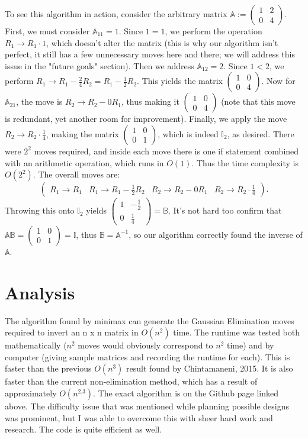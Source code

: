 \documentclass{article}
\begin{document}
To see this algorithm in action, consider the arbitrary matrix $\mathbb{A}:=\begin{pmatrix}1 & 2 \\ 0 & 4\end{pmatrix}$. First, we must consider $\mathbb{A}_{11}=1$. Since $1=1$, we perform the operation $R_1\to R_1\cdot 1$, which doesn't alter the matrix (this is why our algorithm isn't perfect, it still has a few unnecessary moves here and there; we will address this issue in the "future goals" section). Then we address $\mathbb{A}_{12}=2$. Since $1<2$, we perform $R_1\to R_1-\frac{2}{4}R_2=R_1-\frac{1}{2}R_2$. This yields the matrix $\begin{pmatrix}1 & 0 \\ 0 & 4\end{pmatrix}$. Now for $\mathbb{A}_{21}$, the move is $R_2\to R_2-0R_1$, thus making it $\begin{pmatrix}1 & 0 \\ 0 & 4\end{pmatrix}$ (note that this move is redundant, yet another room for improvement). Finally, we apply the move $R_2\to R_2\cdot \frac{1}{4}$, making the matrix $\begin{pmatrix} 1 & 0 \\ 0 & 1\end{pmatrix}$, which is indeed $\mathbb{I}_2$, as desired. There were $2^2$ moves required, and inside each move there is one if statement combined with an arithmetic operation, which runs in $O(1)$. Thus the time complexity is $O(2^2)$. The overall moves are:
$$\begin{pmatrix}R_1\to R_1 & R_1\to R_1-\frac{1}{2}R_2 & R_2\to R_2-0R_1 & R_2\to R_2\cdot \frac{1}{4}\end{pmatrix}.$$
Throwing this onto $\mathbb{I}_2$ yields $\begin{pmatrix}1 & -\frac12\\ 0 & \frac14 \end{pmatrix}=\mathbb{B}$. It's not hard too confirm that $\mathbb{A}\mathbb{B}=\begin{pmatrix}1 & 0 \\ 0 & 1\end{pmatrix}=\mathbb{I}$, thus $\mathbb{B}=\mathbb{A}^{-1}$, so our algorithm correctly found the inverse of $\mathbb{A}$.
\section*{Analysis}
The algorithm found by minimax can generate the Gaussian Elimination moves required to invert an n x n matrix in $O(n^2)$ time. The runtime was tested both mathematically ($n^2$ moves would obviously correspond to $n^2$ time) and by computer (giving sample matrices and recording the runtime for each). This is faster than the previous $O(n^3)$ result found by Chintamaneni, 2015. It is also faster than the current non-elimination method, which has a result of approximately $O(n^{2.3})$. The exact algorithm is on the Github page linked above. The difficulty issue that was mentioned while planning possible designs was prominent, but I was able to overcome this with sheer hard work and research. The code is quite efficient as well.
\end{document}
